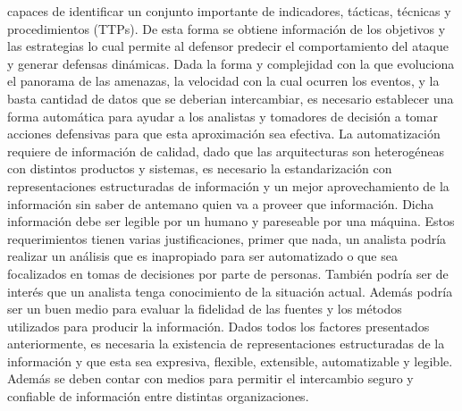 capaces de identificar un conjunto importante de indicadores, tácticas, técnicas 
y procedimientos (TTPs). De esta forma se obtiene información de los objetivos y 
las estrategias lo cual permite al defensor predecir el comportamiento del 
ataque y generar defensas dinámicas. Dada la forma y complejidad con la que 
evoluciona el panorama de las amenazas, la velocidad con la cual ocurren los 
eventos, y la basta cantidad de datos que se deberian intercambiar, es necesario 
establecer una forma automática para ayudar a los analistas y tomadores de 
decisión a tomar acciones defensivas para que esta aproximación sea efectiva. La 
automatización requiere de información de calidad, dado que las arquitecturas 
son heterogéneas con distintos productos y sistemas, es necesario la 
estandarización con representaciones estructuradas de información y un mejor 
aprovechamiento de la información sin saber de antemano quien va a proveer que 
información. Dicha información debe ser legible por un humano y pareseable por 
una máquina. Estos requerimientos tienen varias justificaciones, primer que 
nada, un analista podría realizar un análisis que es inapropiado para ser 
automatizado o que sea focalizados en tomas de decisiones por parte de personas. 
También podría ser de interés que un analista tenga conocimiento de la situación 
actual. Además podría ser un buen medio para evaluar la fidelidad de las fuentes 
y los métodos utilizados para producir la información. Dados todos los factores 
presentados anteriormente, es necesaria la existencia de representaciones 
estructuradas de la información y que esta sea expresiva, flexible, extensible, 
automatizable y legible. Además se deben contar con medios para permitir el 
intercambio seguro y confiable de información entre distintas organizaciones.



